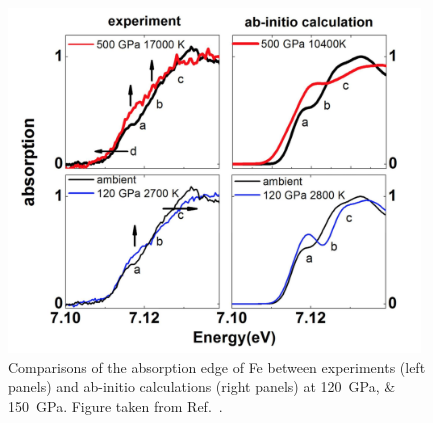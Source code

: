 \begin{figure}
  \includegraphics[width=4.3063in,height=3.5945in]{figures/Task42210-img004.png}
  \caption{%
    Comparisons of the absorption edge of Fe between experiments (left
    panels) and ab-initio calculations (right panels) at
    \SIlist{120;150}{\giga\pascal}. Figure
  taken from Ref.~\cite{Torchio2016}.
  }
  \label{fig:xafs_fig4}
\end{figure}
